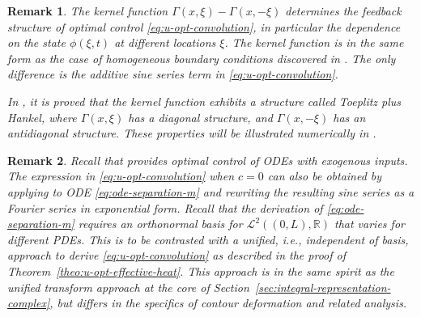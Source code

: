 \documentclass[journal,twoside,web]{ieeecolor}
\newtheorem{remark}{Remark}
\newcommand{\RR}{\mathbb{R}}
\newcommand{\state}{\phi}
\begin{document}
\begin{remark}\label{re:structure}
	The kernel function $\Gamma(x,\xi)-\Gamma(x,-\xi)$ determines the feedback structure of optimal control \eqref{eq:u-opt-convolution}, in particular the dependence on the state $\state(\xi,t)$ at different locations $\xi$. The kernel function is in the same form as the case of homogeneous boundary conditions discovered in \cite{epperlein2016spatially}. The only difference is the additive sine series term in \eqref{eq:u-opt-convolution}. 

	In \cite{epperlein2016spatially}, it is proved that the kernel function exhibits a structure called \emph{Toeplitz plus Hankel}, where $\Gamma(x,\xi)$ has a diagonal structure, and $\Gamma(x,-\xi)$ has an antidiagonal structure. These properties will be illustrated numerically in .
\end{remark}
\begin{remark}
	Recall that  provides optimal control of ODEs with exogenous inputs.
	The expression in \eqref{eq:u-opt-convolution} when $c=0$ can also be obtained by applying  to ODE \eqref{eq:ode-separation-m} and rewriting the resulting sine series as a Fourier series in exponential form. 
	Recall that the derivation of \eqref{eq:ode-separation-m} requires an orthonormal basis for $\mathcal{L}^2((0,L),\RR)$ that varies for different PDEs.
    This is to be contrasted with a unified, i.e., independent of basis, approach to derive \eqref{eq:u-opt-convolution} as described in the proof of Theorem~\ref{theo:u-opt-effective-heat}. This approach is in the same spirit as the unified transform approach at the core of Section~\ref{sec:integral-representation-complex}, but differs in the specifics of contour deformation and related analysis. 
\end{remark}
\end{document}
